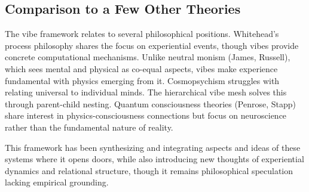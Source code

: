 \subsection{Comparison to a Few Other Theories}

The vibe framework relates to several philosophical positions. Whitehead's process philosophy shares the focus on experiential events, though vibes provide concrete computational mechanisms. Unlike neutral monism (James, Russell), which sees mental and physical as co-equal aspects, vibes make experience fundamental with physics emerging from it. Cosmopsychism struggles with relating universal to individual minds. The hierarchical vibe mesh solves this through parent-child nesting. Quantum consciousness theories (Penrose, Stapp) share interest in physics-consciousness connections but focus on neuroscience rather than the fundamental nature of reality.

This framework has been synthesizing and integrating aspects and ideas of these systems where it opens doors, while also introducing new thoughts of experiential dynamics and relational structure, though it remains philosophical speculation lacking empirical grounding.
